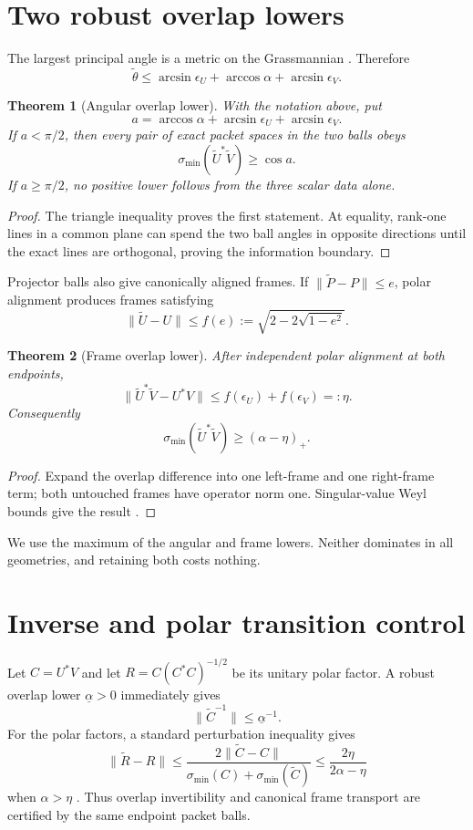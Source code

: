 \documentclass[12pt]{article}
\newtheorem{theorem}{Theorem}
\begin{document}
\section{Two robust overlap lowers}
The largest principal angle is a metric on the Grassmannian
\citep{StewartSun1990}.  Therefore
\[
 \widetilde\theta
 \leq\arcsin\epsilon_U+\arccos\alpha+\arcsin\epsilon_V.
\]

\begin{theorem}[Angular overlap lower]\label{thm:angular}
With the notation above, put
\[
 a=\arccos\alpha+\arcsin\epsilon_U+\arcsin\epsilon_V.
\]
If $a<\pi/2$, then every pair of exact packet spaces in the two balls obeys
\[
 \sigma_{\min}(\widetilde U^*\widetilde V)\geq\cos a.
\]
If $a\geq\pi/2$, no positive lower follows from the three scalar data alone.
\end{theorem}
\begin{proof}
The triangle inequality proves the first statement.  At equality, rank-one
lines in a common plane can spend the two ball angles in opposite directions
until the exact lines are orthogonal, proving the information boundary.
\end{proof}

Projector balls also give canonically aligned frames.  If
$\|\widetilde P-P\|\leq e$, polar alignment produces frames satisfying
\[
 \|\widetilde U-U\|\leq
 f(e):=\sqrt{2-2\sqrt{1-e^2}}.
\]

\begin{theorem}[Frame overlap lower]\label{thm:frame}
After independent polar alignment at both endpoints,
\[
 \|\widetilde U^*\widetilde V-U^*V\|
 \leq f(\epsilon_U)+f(\epsilon_V)=:\eta.
\]
Consequently
\[
 \sigma_{\min}(\widetilde U^*\widetilde V)
 \geq(\alpha-\eta)_+.
\]
\end{theorem}
\begin{proof}
Expand the overlap difference into one left-frame and one right-frame term;
both untouched frames have operator norm one.  Singular-value Weyl bounds
give the result \citep{Bhatia1997}.
\end{proof}

We use the maximum of the angular and frame lowers.  Neither dominates in all
geometries, and retaining both costs nothing.

\section{Inverse and polar transition control}
Let $C=U^*V$ and let $R=C(C^*C)^{-1/2}$ be its unitary polar factor.  A robust
overlap lower $\underline\alpha>0$ immediately gives
\[
 \|\widetilde C^{-1}\|\leq\underline\alpha^{-1}.
\]
For the polar factors, a standard perturbation inequality gives
\[
 \|\widetilde R-R\|
 \leq\frac{2\|\widetilde C-C\|}
 {\sigma_{\min}(C)+\sigma_{\min}(\widetilde C)}
 \leq\frac{2\eta}{2\alpha-\eta}
\]
when $\alpha>\eta$ \citep{Li1995}.  Thus overlap invertibility and canonical
frame transport are certified by the same endpoint packet balls.
\end{document}
